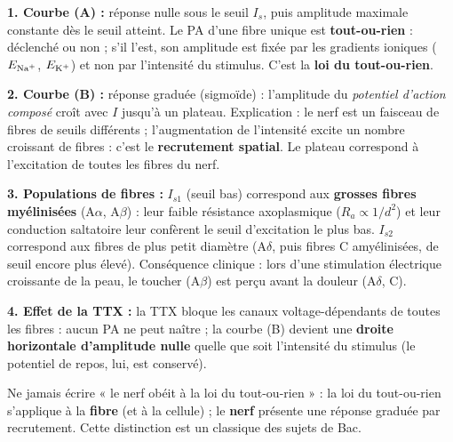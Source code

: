 \documentclass[11pt]{article}
\begin{document}
\begin{corrige}
\textbf{1. Courbe (A) :} réponse nulle sous le seuil $I_s$, puis amplitude maximale constante dès le seuil atteint. Le PA d'une fibre unique est \textbf{tout-ou-rien} : déclenché ou non ; s'il l'est, son amplitude est fixée par les gradients ioniques ($E_{\ce{Na+}}$, $E_{\ce{K+}}$) et non par l'intensité du stimulus. C'est la \textbf{loi du tout-ou-rien}.

\textbf{2. Courbe (B) :} réponse graduée (sigmoïde) : l'amplitude du \emph{potentiel d'action composé} croît avec $I$ jusqu'à un plateau. Explication : le nerf est un faisceau de fibres de seuils différents ; l'augmentation de l'intensité excite un nombre croissant de fibres : c'est le \textbf{recrutement spatial}. Le plateau correspond à l'excitation de toutes les fibres du nerf.

\textbf{3. Populations de fibres :} $I_{s1}$ (seuil bas) correspond aux \textbf{grosses fibres myélinisées} (A$\alpha$, A$\beta$) : leur faible résistance axoplasmique ($R_a \propto 1/d^2$) et leur conduction saltatoire leur confèrent le seuil d'excitation le plus bas. $I_{s2}$ correspond aux fibres de plus petit diamètre (A$\delta$, puis fibres C amyélinisées, de seuil encore plus élevé). Conséquence clinique : lors d'une stimulation électrique croissante de la peau, le toucher (A$\beta$) est perçu avant la douleur (A$\delta$, C).

\textbf{4. Effet de la TTX :} la TTX bloque les canaux  voltage-dépendants de toutes les fibres : aucun PA ne peut naître ; la courbe (B) devient une \textbf{droite horizontale d'amplitude nulle} quelle que soit l'intensité du stimulus (le potentiel de repos, lui, est conservé).

\begin{attention}
Ne jamais écrire « le nerf obéit à la loi du tout-ou-rien » : la loi du tout-ou-rien s'applique à la \textbf{fibre} (et à la cellule) ; le \textbf{nerf} présente une réponse graduée par recrutement. Cette distinction est un classique des sujets de Bac.
\end{attention}
\end{corrige}
\end{document}
